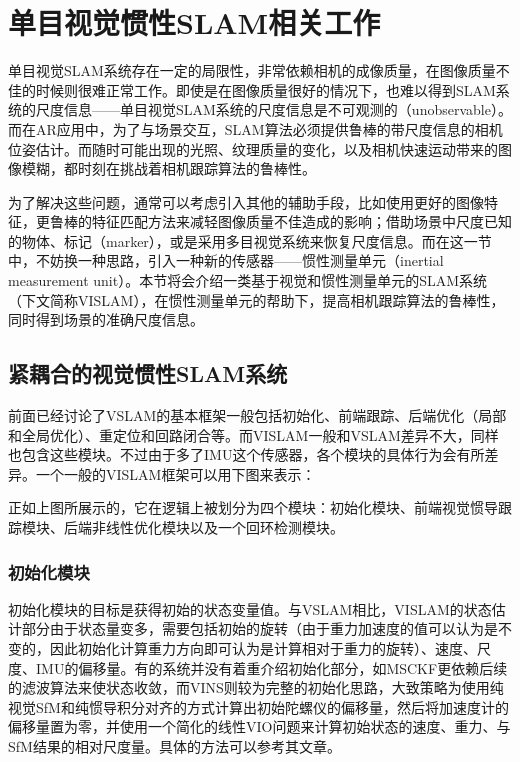 \section{单目视觉惯性SLAM相关工作}

单目视觉SLAM系统存在一定的局限性，非常依赖相机的成像质量，在图像质量不佳的时候则很难正常工作。即使是在图像质量很好的情况下，也难以得到SLAM系统的尺度信息——单目视觉SLAM系统的尺度信息是不可观测的（unobservable）\citep{jones2011visual}。而在AR应用中，为了与场景交互，SLAM算法必须提供鲁棒的带尺度信息的相机位姿估计。而随时可能出现的光照、纹理质量的变化，以及相机快速运动带来的图像模糊，都时刻在挑战着相机跟踪算法的鲁棒性。

为了解决这些问题，通常可以考虑引入其他的辅助手段，比如使用更好的图像特征，更鲁棒的特征匹配方法来减轻图像质量不佳造成的影响；借助场景中尺度已知的物体、标记（marker），或是采用多目视觉系统来恢复尺度信息。而在这一节中，不妨换一种思路，引入一种新的传感器——惯性测量单元（inertial measurement unit）。本节将会介绍一类基于视觉和惯性测量单元的SLAM系统（下文简称VISLAM），在惯性测量单元的帮助下，提高相机跟踪算法的鲁棒性，同时得到场景的准确尺度信息。

\subsection{紧耦合的视觉惯性SLAM系统}

前面已经讨论了VSLAM的基本框架一般包括初始化、前端跟踪、后端优化（局部和全局优化）、重定位和回路闭合等。而VISLAM一般和VSLAM差异不大，同样也包含这些模块。不过由于多了IMU这个传感器，各个模块的具体行为会有所差异。一个一般的VISLAM框架可以用下图来表示：

正如上图所展示的，它在逻辑上被划分为四个模块：初始化模块、前端视觉惯导跟踪模块、后端非线性优化模块以及一个回环检测模块。

\subsubsection{初始化模块}

初始化模块的目标是获得初始的状态变量值。与VSLAM相比，VISLAM的状态估计部分由于状态量变多，需要包括初始的旋转（由于重力加速度的值可以认为是不变的，因此初始化计算重力方向即可认为是计算相对于重力的旋转）、速度、尺度、IMU的偏移量。有的系统并没有着重介绍初始化部分，如MSCKF\citep{mourikis2007multi}更依赖后续的滤波算法来使状态收敛，而VINS\citep{li2017monocular}则较为完整的初始化思路，大致策略为使用纯视觉SfM和纯惯导积分对齐的方式计算出初始陀螺仪的偏移量，然后将加速度计的偏移量置为零，并使用一个简化的线性VIO问题来计算初始状态的速度、重力、与SfM结果的相对尺度量。具体的方法可以参考其文章。

